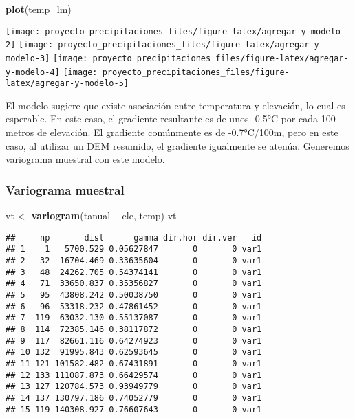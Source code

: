 \documentclass[11pt,]{article}
\newenvironment{Shaded}{\begin{snugshade}}{\end{snugshade}}
\newcommand{\KeywordTok}[1]{\textcolor[rgb]{0.13,0.29,0.53}{\textbf{#1}}}
\newcommand{\StringTok}[1]{\textcolor[rgb]{0.31,0.60,0.02}{#1}}
\newcommand{\OperatorTok}[1]{\textcolor[rgb]{0.81,0.36,0.00}{\textbf{#1}}}
\newcommand{\NormalTok}[1]{#1}
\begin{document}
\begin{Shaded}
\begin{Highlighting}[]
\KeywordTok{plot}\NormalTok{(temp_lm)}
\end{Highlighting}
\end{Shaded}

\texttt{[image: proyecto\_precipitaciones\_files/figure-latex/agregar-y-modelo-2]}
\texttt{[image: proyecto\_precipitaciones\_files/figure-latex/agregar-y-modelo-3]}
\texttt{[image: proyecto\_precipitaciones\_files/figure-latex/agregar-y-modelo-4]}
\texttt{[image: proyecto\_precipitaciones\_files/figure-latex/agregar-y-modelo-5]}

El modelo sugiere que existe asociación entre temperatura y elevación,
lo cual es esperable. En este caso, el gradiente resultante es de unos
-0.5°C por cada 100 metros de elevación. El gradiente comúnmente es de
-0.7°C/100m, pero en este caso, al utilizar un DEM resumido, el
gradiente igualmente se atenúa. Generemos variograma muestral con este
modelo.

\subsubsection{Variograma muestral}\label{variograma-muestral-1}

\begin{Shaded}
\begin{Highlighting}[]
\NormalTok{vt <-}\StringTok{ }\KeywordTok{variogram}\NormalTok{(tanual }\OperatorTok{~}\StringTok{ }\NormalTok{ele, temp)}
\NormalTok{vt}
\end{Highlighting}
\end{Shaded}

\begin{verbatim}
##     np       dist      gamma dir.hor dir.ver   id
## 1    1   5700.529 0.05627847       0       0 var1
## 2   32  16704.469 0.33635604       0       0 var1
## 3   48  24262.705 0.54374141       0       0 var1
## 4   71  33650.837 0.35356827       0       0 var1
## 5   95  43808.242 0.50038750       0       0 var1
## 6   96  53318.232 0.47861452       0       0 var1
## 7  119  63032.130 0.55137087       0       0 var1
## 8  114  72385.146 0.38117872       0       0 var1
## 9  117  82661.116 0.64274923       0       0 var1
## 10 132  91995.843 0.62593645       0       0 var1
## 11 121 101582.482 0.67431891       0       0 var1
## 12 133 111087.873 0.66429574       0       0 var1
## 13 127 120784.573 0.93949779       0       0 var1
## 14 137 130797.186 0.74052779       0       0 var1
## 15 119 140308.927 0.76607643       0       0 var1
\end{verbatim}
\end{document}
